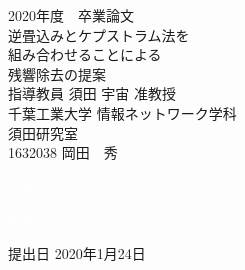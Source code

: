 \documentclass[a4j,11pt]{jsarticle}
\begin{document}
\setcounter{tocdepth}{3}
\thispagestyle{empty}
\clearpage
\addtocounter{page}{-1}
\begin{center}

\huge
2020年度　卒業論文\\[60pt]
\HUGE
逆畳込みとケプストラム法を\\
組み合わせることによる\\
残響除去の提案\\[65pt]
\huge
指導教員 須田 宇宙 准教授\\[40pt]
千葉工業大学 情報ネットワーク学科\\[10pt]
須田研究室\\[40pt]
1632038 \hspace{70pt} 岡田　秀\\[110pt]
\end{center}
\begin{flushright} 
\huge

\textcolor{white}{文字}

\textcolor{white}{文字}

提出日 2020年1月24日
\end{flushright}
\newpage
\thispagestyle{empty}
\clearpage
\addtocounter{page}{-1}
\large
\tableofcontents
\thispagestyle{empty}
\clearpage
\addtocounter{page}{-1}
\newpage
\listoftables
\listoffigures
\thispagestyle{empty}
\clearpage
\addtocounter{page}{-1}
\begin{comment}

\end{comment}
\newpage
\end{document}
